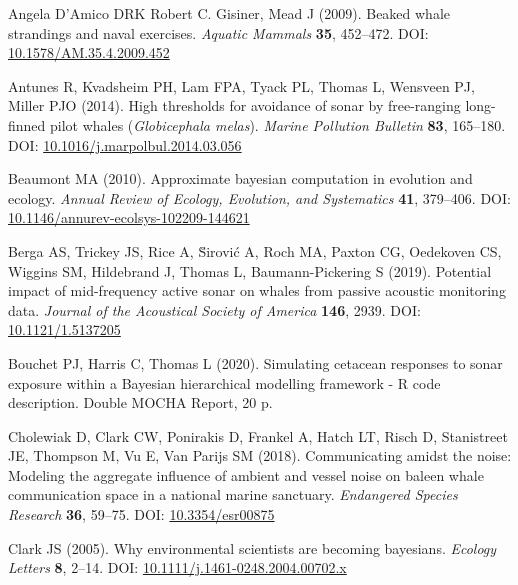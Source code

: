 \documentclass[
]{article}
\begin{document}
\hypertarget{refs}{}
\leavevmode\hypertarget{ref-Damico2009b}{}%
Angela D'Amico DRK Robert C. Gisiner, Mead J (2009). Beaked whale strandings and naval exercises. \emph{Aquatic Mammals} \textbf{35}, 452--472. DOI: \href{https://doi.org/10.1578/AM.35.4.2009.452}{10.1578/AM.35.4.2009.452}

\leavevmode\hypertarget{ref-Antunes2014}{}%
Antunes R, Kvadsheim PH, Lam FPA, Tyack PL, Thomas L, Wensveen PJ, Miller PJO (2014). High thresholds for avoidance of sonar by free-ranging long-finned pilot whales (\emph{Globicephala melas}). \emph{Marine Pollution Bulletin} \textbf{83}, 165--180. DOI: \href{https://doi.org/10.1016/j.marpolbul.2014.03.056}{10.1016/j.marpolbul.2014.03.056}

\leavevmode\hypertarget{ref-Beaumont2010}{}%
Beaumont MA (2010). Approximate bayesian computation in evolution and ecology. \emph{Annual Review of Ecology, Evolution, and Systematics} \textbf{41}, 379--406. DOI: \href{https://doi.org/10.1146/annurev-ecolsys-102209-144621}{10.1146/annurev-ecolsys-102209-144621}

\leavevmode\hypertarget{ref-Berga2019}{}%
Berga AS, Trickey JS, Rice A, S̆irović A, Roch MA, Paxton CG, Oedekoven CS, Wiggins SM, Hildebrand J, Thomas L, Baumann-Pickering S (2019). Potential impact of mid-frequency active sonar on whales from passive acoustic monitoring data. \emph{Journal of the Acoustical Society of America} \textbf{146}, 2939. DOI: \href{https://doi.org/10.1121/1.5137205}{10.1121/1.5137205}

\leavevmode\hypertarget{ref-Bouchet2020b}{}%
Bouchet PJ, Harris C, Thomas L (2020). Simulating cetacean responses to sonar exposure within a Bayesian hierarchical modelling framework - R code description. Double MOCHA Report, 20 p.

\leavevmode\hypertarget{ref-Cholewiak2018}{}%
Cholewiak D, Clark CW, Ponirakis D, Frankel A, Hatch LT, Risch D, Stanistreet JE, Thompson M, Vu E, Van Parijs SM (2018). Communicating amidst the noise: Modeling the aggregate influence of ambient and vessel noise on baleen whale communication space in a national marine sanctuary. \emph{Endangered Species Research} \textbf{36}, 59--75. DOI: \href{https://doi.org/10.3354/esr00875}{10.3354/esr00875}

\leavevmode\hypertarget{ref-Clark2005}{}%
Clark JS (2005). Why environmental scientists are becoming bayesians. \emph{Ecology Letters} \textbf{8}, 2--14. DOI: \href{https://doi.org/10.1111/j.1461-0248.2004.00702.x}{10.1111/j.1461-0248.2004.00702.x}
\end{document}
